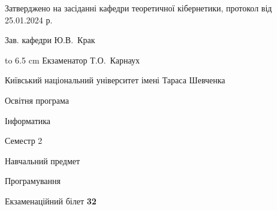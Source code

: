 \documentclass[12pt, ukrainian]{article}
\begin{document}
{\smallskip\smallskip \begin {scriptsize} Затверджено на засіданні кафедри теоретичної кібернетики, протокол   від   25.01.2024 р.\par\smallskip\smallskip\smallskip\smallskip
{\parbox {6.5 cm} {Зав. кафедри \dotfill Ю.В.~Крак}}\hspace {0.7cm} {\hbox to 6.5 cm { Екзаменатор \dotfill Т.О.~Карнаух}} \end{scriptsize}}
\newpage
{{\begin {scriptsize}\par
{ \center  Київський національний університет імені Тараса Шевченка \par}
{\parbox {5 cm}{Освітня програма \hfill}{\parbox {7 cm}{Інформатика\hfill}}\parbox {6 cm}{\hfill Семестр 2}}\par
{\parbox {5 cm} {Навчальний предмет \hfill}\parbox {7 cm}{Програмування \hfill}\parbox {6cm}{\hfill}\par}\vspace{-15pt} \end{scriptsize}}{\center Екзаменаційний білет \No \textbf { 32 }\par}}
\end{document}
